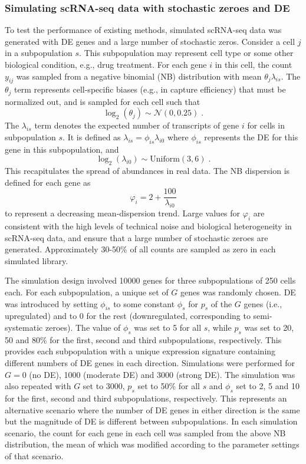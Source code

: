 \documentclass{bmcart}
\begin{document}
\subsubsection*{Simulating scRNA-seq data with stochastic zeroes and DE}
To test the performance of existing methods, simulated scRNA-seq data was generated with DE genes and a large number of stochastic zeros.
Consider a cell $j$ in a subpopulation $s$.
This subpopulation may represent cell type or some other biological condition, e.g., drug treatment. 
For each gene $i$ in this cell, the count $y_{ij}$ was sampled from a negative binomial (NB) distribution with mean $\theta_{j}\lambda_{is}$.
The $\theta_{j}$ term represents cell-specific biases (e.g., in capture efficiency) that must be normalized out, 
    and is sampled for each cell such that 
\[
\log_2(\theta_j) \sim \mathcal{N}(0, 0.25) \;.
\]
The $\lambda_{is}$ term denotes the expected number of transcripts of gene $i$ for cells in subpopulation $s$.
It is defined as $\lambda_{is}=\phi_{is}\lambda_{i0}$ where $\phi_{is}$ represents the DE for this gene in this subpopulation, and 
\[
\log_2(\lambda_{i0}) \sim \mbox{Uniform}(3, 6) \;.
\]
This recapitulates the spread of abundances in real data.
The NB dispersion is defined for each gene as 
\[
    \varphi_i = 2 + \frac{100}{\lambda_{i0}}
\]
to represent a decreasing mean-dispersion trend.
Large values for $\varphi_i$ are consistent with the high levels of technical noise and biological heterogeneity in scRNA-seq data,
    and ensure that a large number of stochastic zeroes are generated.
Approximately 30-50\% of all counts are sampled as zero in each simulated library.

The simulation design involved 10000 genes for three subpopulations of 250 cells each.
For each subpopulation, a unique set of $G$ genes was randomly chosen.
DE was introduced by setting $\phi_{is}$ to some constant $\phi_s$ for $p_s$ of the $G$ genes (i.e., upregulated) and to $0$ for the rest (downregulated, corresponding to semi-systematic zeroes).
The value of $\phi_s$ was set to 5 for all $s$, while $p_s$ was set to 20, 50 and 80\% for the first, second and third subpopulations, respectively.
This provides each subpopulation with a unique expression signature containing different numbers of DE genes in each direction.
Simulations were performed for $G = 0$ (no DE), 1000 (moderate DE) and 3000 (strong DE).
The simulation was also repeated with $G$ set to 3000, $p_s$ set to 50\% for all $s$ and $\phi_{s}$ set to 2, 5 and 10 for the first, second and third subpopulations, respectively.
This represents an alternative scenario where the number of DE genes in either direction is the same but the magnitude of DE is different between subpopulations.
In each simulation scenario, the count for each gene in each cell was sampled from the above NB distribution,
    the mean of which was modified according to the parameter settings of that scenario.
\end{document}
